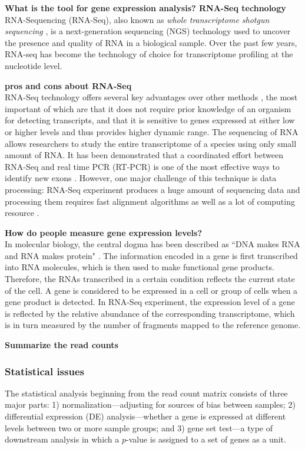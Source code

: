 	 	\textbf{What is the tool for gene expression analysis? RNA-Seq technology}\\
	 	RNA-Sequencing (RNA-Seq), also known as \textit{whole transcriptome shotgun sequencing} \citep{morin2008profiling}, is a next-generation sequencing (NGS) technology used to uncover the presence and quality of RNA in a biological sample. Over the past few years, RNA-seq has become the technology of choice for transcriptome profiling  at the nucleotide level.  
	 	
	 	
	 	
	 	
	 
	 \textbf{pros and cons about RNA-Seq}\\
	 RNA-Seq technology offers several key advantages over other methods \citep{wang2009rna}, the most important of which are that it does not require prior knowledge of an organism for detecting transcripts,  and that it is sensitive to genes expressed at either low or higher levels and thus provides higher dynamic range. The sequencing of RNA allows researchers to study the entire transcriptome of a species using only small amount of RNA. It has been demonstrated that a coordinated effort between RNA-Seq and real time PCR (RT-PCR) is one of the most effective ways to identify new exons \citep{howald2012combining}. However, one major challenge of this technique is data processing: RNA-Seq experiment produces a huge amount of sequencing data and processing them requires fast alignment algorithms as well as a lot of computing resource \citep{langmead2009ultrafast,li2010fast}.
	
	
	\textbf{How do people measure gene expression levels?}\\
		In molecular biology, the central dogma has been described as ``DNA makes RNA and RNA makes protein" \citep{leavitt2004deciphering}. The information encoded in a gene is first transcribed into RNA molecules, which is then used to make functional gene products. Therefore, the RNAs transcribed in a certain condition reflects the current state of the cell. A gene is considered to be expressed in a cell or group of cells when a gene product is detected. In RNA-Seq experiment, the expression level of a gene is reflected by the relative abundance of the corresponding transcriptome, which is in turn measured by the number of fragments  mapped to the reference genome. 
		
	\textbf{Summarize the read counts}

	\subsubsection{Statistical issues}
	The statistical analysis beginning from the read count matrix consists of three major parts: 1) normalization---adjusting for sources of bias between samples; 2) differential expression (DE) analysis---whether a gene is expressed at different levels between two or more sample groups; and 3) gene set test---a type of downstream analysis in which a $p$-value is assigned to a set of genes as a unit.
	
